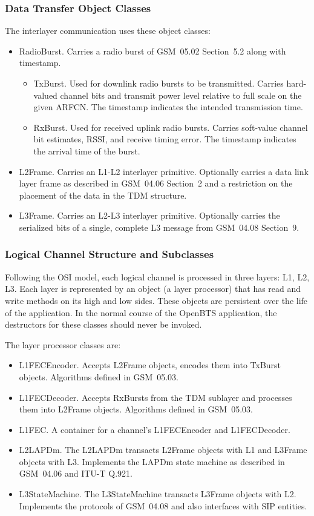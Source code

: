 \documentclass[11pt]{book}
\begin{document}
\subsubsection{Data Transfer Object Classes}
The interlayer communication uses these object classes:
\begin{itemize}
	\item RadioBurst. Carries a radio burst of GSM~05.02 Section~5.2 along with timestamp.
	\begin{itemize}
		\item TxBurst. Used for downlink radio bursts to be transmitted. Carries hard-valued channel bits and transmit power level relative to full scale on the given ARFCN.  The timestamp indicates the intended transmission time.
		\item RxBurst. Used for received uplink radio bursts. Carries soft-value channel bit estimates, RSSI, and receive timing error.  The timestamp indicates the arrival time of the burst.
	\end{itemize}
	\item L2Frame. Carries an L1-L2 interlayer primitive.  Optionally carries a data link layer frame as described in GSM~04.06 Section~2 and a restriction on the placement of the data in the TDM structure.
	\item L3Frame. Carries an L2-L3 interlayer primitive.  Optionally carries the serialized bits of a single, complete L3 message from GSM~04.08 Section~9.
\end{itemize}

\subsubsection{Logical Channel Structure and Subclasses}
Following the OSI model, each logical channel is processed in three layers: L1, L2, L3. Each layer is represented by an object (a layer processor) that has read and write methods on its high and low sides.  These objects are persistent over the life of the application.  In the normal course of the OpenBTS application, the destructors for these classes should never be invoked.

The layer processor classes are:
\begin{itemize}
	\item L1FECEncoder. Accepts L2Frame objects, encodes them into TxBurst objects.  Algorithms defined in GSM~05.03.
	\item L1FECDecoder. Accepts RxBursts from the TDM sublayer and processes them into L2Frame objects. Algorithms defined in GSM~05.03.
	\item L1FEC.  A container for a channel's L1FECEncoder and L1FECDecoder.
	\item L2LAPDm. The L2LAPDm transacts L2Frame objects with L1 and L3Frame objects with L3.  Implements the LAPDm state machine as described in GSM~04.06 and ITU-T Q.921.
	\item L3StateMachine. The L3StateMachine transacts L3Frame objects with L2.  Implements the protocols of GSM~04.08 and also interfaces with SIP entities.
\end{itemize}
\end{document}
